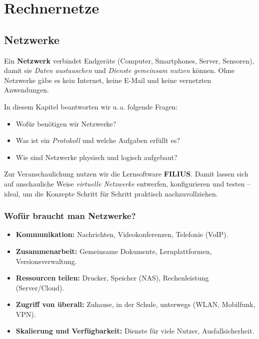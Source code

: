 \documentclass[../skript/main.tex]{subfiles}
\begin{document}
	\chapter{Rechnernetze}\label{chap:rechnernetze}
	
	\section{Netzwerke}
	
Ein \textbf{Netzwerk} verbindet Endgeräte (Computer, Smartphones, Server, Sensoren), damit sie
\emph{Daten austauschen} und \emph{Dienste gemeinsam nutzen} können. Ohne Netzwerke gäbe es
kein Internet, keine E-Mail und keine vernetzten Anwendungen.

In diesem Kapitel beantworten wir u.\,a. folgende Fragen:
\begin{itemize}
	\item Wofür benötigen wir Netzwerke?
	\item Was ist ein \emph{Protokoll} und welche Aufgaben erfüllt es?
	\item Wie sind Netzwerke physisch und logisch aufgebaut?
\end{itemize}

Zur Veranschaulichung nutzen wir die Lernsoftware \textbf{FILIUS}. Damit lassen sich auf
anschauliche Weise \emph{virtuelle Netzwerke} entwerfen, konfigurieren und testen – ideal, um
die Konzepte Schritt für Schritt praktisch nachzuvollziehen.
	
	\subsection*{Wofür braucht man Netzwerke?}
	\begin{itemize}
		\item \textbf{Kommunikation:} Nachrichten, Videokonferenzen, Telefonie (VoIP).
		\item \textbf{Zusammenarbeit:} Gemeinsame Dokumente, Lernplattformen, Versionsverwaltung.
		\item \textbf{Ressourcen teilen:} Drucker, Speicher (NAS), Rechenleistung (Server/Cloud).
		\item \textbf{Zugriff von überall:} Zuhause, in der Schule, unterwegs (WLAN, Mobilfunk, VPN).
		\item \textbf{Skalierung und Verfügbarkeit:} Dienste für viele Nutzer, Ausfallsicherheit.
	\end{itemize}
	
\end{document}
